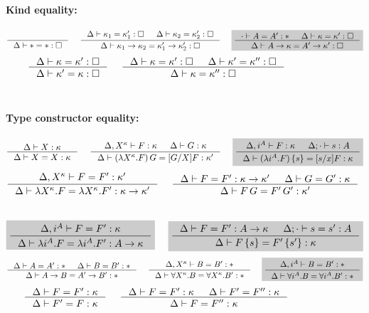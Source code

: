 \begin{figure}
\begin{framed}
\paragraph{Kind equality:} 
\[ \inference{}{\Delta |- * = *:\square}
 ~~~~
   \inference{ \Delta |- \kappa_1 = \kappa_1' : \square
             & \Delta |- \kappa_2 = \kappa_2' : \square }
             {\Delta |- \kappa_1 -> \kappa_2 = \kappa_1' -> \kappa_2' : \square}
 ~~~~ \newFi{
   \inference{\cdot |- A=A':* & \Delta |- \kappa=\kappa':\square}
             {\Delta |- A -> \kappa = A' -> \kappa' : \square} }
\]
\[ \inference{\Delta |- \kappa=\kappa':\square}
             {\Delta |- \kappa'=\kappa:\square}
 ~~~~
   \inference{ \Delta |- \kappa =\kappa' :\square
             & \Delta |- \kappa'=\kappa'':\square}
             {\Delta |- \kappa=\kappa'':\square}
\]
~\\
\paragraph{Type constructor equality:} 
\[ \inference{\Delta |- X:\kappa }{\Delta |- X=X:\kappa}
 ~~~~
   \inference{\Delta,X^\kappa |- F:\kappa & \Delta |- G:\kappa}
             {\Delta |- (\lambda X^\kappa.F)\,G = [G/X]F:\kappa'}
 ~~~~ \newFi{
   \inference{\Delta,i^A |- F:\kappa & \Delta;\cdot |- s:A}
             {\Delta |- (\lambda i^A.F)\,\{s\} = [s/x]F:\kappa} }
\]
\[ \inference{\Delta,X^\kappa |- F=F' : \kappa'}
             {\Delta |- \lambda X^\kappa.F=\lambda X^\kappa.F':\kappa-> \kappa'}
 ~~~~
   \inference{\Delta |- F=F':\kappa->\kappa' & \Delta |- G=G':\kappa}
             {\Delta |- F\,G = F'\,G' : \kappa'}
\]
 ~~~~
\[ \newFi{
   \inference{\Delta,i^A |- F=F' : \kappa}
             {\Delta |- \lambda i^A.F=\lambda i^A.F' : A -> \kappa} }
 ~~~~ \newFi{
   \inference{\Delta |- F=F':A->\kappa & \Delta;\cdot |- s=s':A}
             {\Delta |- F\,\{s\} = F'\,\{s'\} : \kappa} }
\]
\[ \inference{\Delta |- A=A':* & \Delta |- B=B':*}{\Delta |- A-> B=A'-> B':*}
 ~~~~
   \inference{\Delta,X^\kappa |- B=B':*}
             {\Delta |- \forall X^\kappa.B=\forall X^\kappa.B':*}
 ~~~~ \newFi{
   \inference{\Delta,i^A |- B=B':*}
             {\Delta |- \forall i^A.B=\forall i^A.B':*} }
\]
\[ \inference{\Delta |- F = F' : \kappa}{\Delta |- F' = F : \kappa}
 ~~~~
   \inference{\Delta |- F = F' : \kappa & \Delta |- F' = F'' : \kappa}
             {\Delta |- F = F'' : \kappa}
\]
~\\

\end{framed}
\end{figure}
